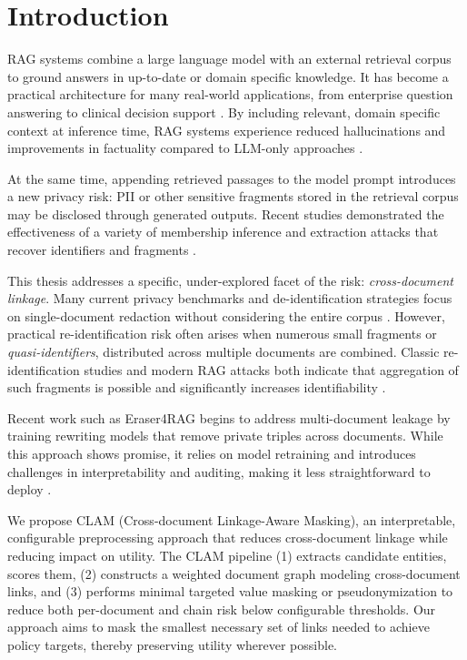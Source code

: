 
\chapter{Introduction}\label{chapter:introduction}

\ac{RAG} systems combine a large language model with an external retrieval corpus to ground answers in up-to-date or domain specific knowledge. It has become a practical architecture for many real-world applications, from enterprise question answering to clinical decision support \cite{chatDoctor}. By including relevant, domain specific context at inference time, RAG systems experience reduced hallucinations \cite{ragNoHallucination} and improvements in factuality compared to LLM-only approaches \cite{ragOrigin}.

At  the same time, appending retrieved passages to the model prompt introduces a new privacy risk: \ac{PII} or other sensitive fragments stored in the retrieval corpus may be disclosed through generated outputs. Recent studies demonstrated the effectiveness of a variety of membership inference and extraction attacks that recover identifiers and fragments \cite{ragMIA, ragThief,generatingIsBelieving,goodAndBad,DEAL}. 

This thesis addresses a specific, under-explored facet of the risk: \textit{cross-document linkage}. Many current privacy benchmarks and de-identification strategies focus on single-document redaction without considering the entire corpus \cite{LPRAG,DPVoteRAG,ragSAGE}. However, practical re-identification risk often arises when numerous small fragments or \textit{quasi-identifiers}, distributed across multiple documents are combined. Classic re-identification studies and modern RAG attacks both indicate that aggregation of such fragments is possible and significantly increases identifiability \cite{ragThief,netflixDeAnon, simpleDemographic}.

Recent work such as Eraser4RAG begins to address multi-document leakage by training rewriting models that remove private triples across documents. While this approach shows promise, it relies on model retraining and introduces challenges in interpretability and auditing, making it less straightforward to deploy \cite{eraser4RAG}.

We propose CLAM (Cross-document Linkage-Aware Masking), an interpretable, configurable preprocessing approach that reduces cross-document linkage while reducing impact on utility. The CLAM pipeline (1) extracts candidate entities, scores them, (2) constructs a weighted document graph modeling cross-document links, and (3) performs minimal targeted value masking or pseudonymization to reduce both per-document and chain risk below configurable thresholds. Our approach aims to mask the smallest necessary set of links needed to achieve policy targets, thereby preserving utility wherever possible.

